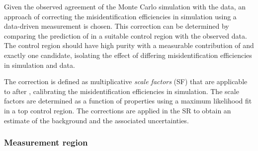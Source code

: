 Given the observed agreement of the Monte Carlo simulation with the
data, an approach of correcting the \jettotauhadvis misidentification
efficiencies in simulation using a data-driven measurement is
chosen. This correction can be determined by comparing the prediction
of \ttbarFakes in a suitable control region with the observed
data. The control region should have high \ttbar purity with a
measurable contribution of \ttbarFakes and exactly one \tauhadvis
candidate, isolating the effect of differing misidentification
efficiencies in simulation and data.

The correction is defined as multiplicative \emph{scale factors} (SF)
that are applicable to \faketauhadvis after \tauid, calibrating the
\jettotauhadvis misidentification efficiencies in simulation. The
scale factors are determined as a function of \faketauhadvis
properties using a maximum likelihood fit in a top control region. The
corrections are applied in the \hadhad SR to obtain an estimate of the
\ttbarFakes background and the associated uncertainties.



\subsubsection{Measurement region}


